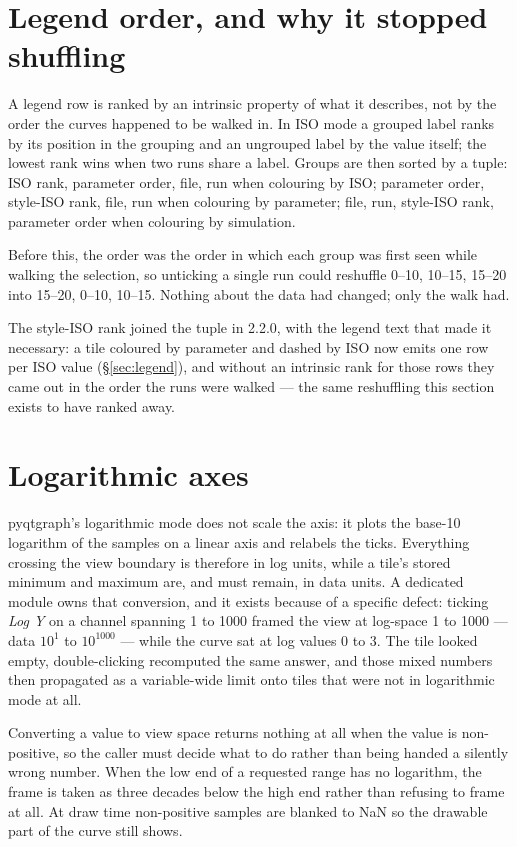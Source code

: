 \documentclass[11pt,a4paper,oneside]{report}
\newcommand{\appver}{2.2.0}
\begin{document}
\section{Legend order, and why it stopped shuffling}

A legend row is ranked by an intrinsic property of what it describes, not by the
order the curves happened to be walked in. In ISO mode a grouped label ranks by
its position in the grouping and an ungrouped label by the value itself; the
lowest rank wins when two runs share a label. Groups are then sorted by a tuple:
ISO rank, parameter order, file, run when colouring by ISO; parameter order,
style-ISO rank, file, run when colouring by parameter; file, run, style-ISO
rank, parameter order when colouring by simulation.

Before this, the order was the order in which each group was first seen while
walking the selection, so unticking a single run could reshuffle 0--10, 10--15,
15--20 into 15--20, 0--10, 10--15. Nothing about the data had changed; only the
walk had.

The style-ISO rank joined the tuple in \appver, with the legend text that made
it necessary: a tile coloured by parameter and dashed by ISO now emits one row
per ISO value (\S\ref{sec:legend}), and without an intrinsic rank for those rows
they came out in the order the runs were walked --- the same reshuffling this
section exists to have ranked away.

\section{Logarithmic axes}

pyqtgraph's logarithmic mode does not scale the axis: it plots the base-10
logarithm of the samples on a linear axis and relabels the ticks. Everything
crossing the view boundary is therefore in log units, while a tile's stored
minimum and maximum are, and must remain, in data units. A dedicated module owns
that conversion, and it exists because of a specific defect: ticking \emph{Log
Y} on a channel spanning 1 to 1000 framed the view at log-space 1 to 1000 ---
data $10^1$ to $10^{1000}$ --- while the curve sat at log values 0 to 3. The
tile looked empty, double-clicking recomputed the same answer, and those mixed
numbers then propagated as a variable-wide limit onto tiles that were not in
logarithmic mode at all.

Converting a value to view space returns nothing at all when the value is
non-positive, so the caller must decide what to do rather than being handed a
silently wrong number. When the low end of a requested range has no logarithm,
the frame is taken as three decades below the high end rather than refusing to
frame at all. At draw time non-positive samples are blanked to NaN so the
drawable part of the curve still shows.
\end{document}
